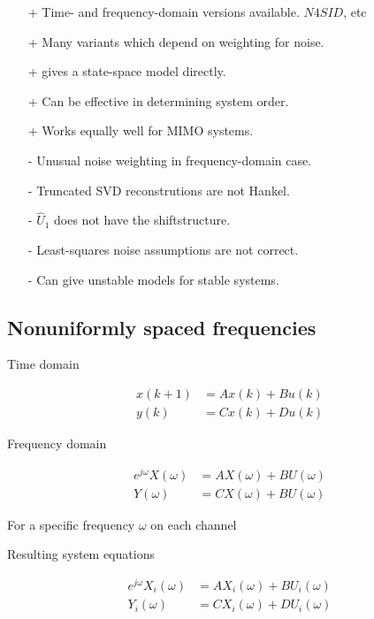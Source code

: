 \documentclass[10pt,a4paper]{scrartcl}
\newcommand{\ejo}{(e^{j\omega})}
\begin{document}
\begin{multicols*}{2}
\begin{itemize}
\mportant{$||\hat{G}_N\ejo-G\ejo||_\infty=0$ for all $N>N_0$}
\end{itemize}

\begin{itemize}
\item[+] Time- and frequency-domain versions available. $N4SID$, etc
\item[+] Many variants which depend on weighting for noise.
\item[+] gives a state-space model directly.
\item[+] Can be effective in determining system order.
\item[+] Works equally well for MIMO systems.
\item[-] Unusual noise weighting in frequency-domain case.
\item[-] Truncated SVD reconstrutions are not Hankel.
\item[-] $\hat{U}_1$ does not have the \glqq shift\grqq structure.
\item[-] Least-squares noise assumptions are not correct.
\item[-] Can give unstable models for stable systems.
\end{itemize}

\subsection{Nonuniformly spaced frequencies}

Time domain

\begin{align*}
x(k+1)&=Ax(k)+Bu(k)\\
y(k)&=Cx(k)+Du(k)
\end{align*}

Frequency domain

\begin{align*}
e^{j\omega}X(\omega)&=AX(\omega)+BU(\omega)\\
Y(\omega)&=CX(\omega)+BU(\omega)
\end{align*}

For a specific frequency $\omega$ on each channel


Resulting system equations

\begin{align*}
e^{j\omega}X_i(\omega)&=AX_i(\omega)+BU_i(\omega)\\
Y_i(\omega)&=CX_i(\omega)+DU_i(\omega)
\end{align*}


\end{multicols*}
\end{document}
